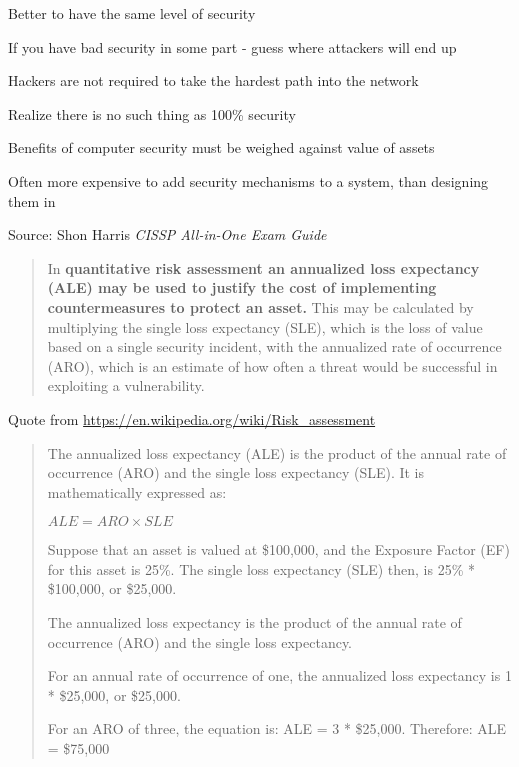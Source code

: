 \documentclass[Screen16to9,17pt]{foils}
\begin{document}
\begin{list1}
\item Better to have the same level of security
\item If you have bad security in some part - guess where attackers will end up
\item Hackers are not required to take the hardest path into the network
\item Realize there is no such thing as 100\% security
\end{list1}



\begin{list1}
\item Benefits of computer security must be weighed against value of assets
\item Often more expensive to add security mechanisms to a system, than designing them in
\end{list1}




Source: Shon Harris \emph{CISSP All-in-One Exam Guide}



\begin{quote}
In {\bf quantitative risk assessment an annualized loss expectancy (ALE) may be used to justify the cost of implementing countermeasures to protect an asset.} This may be calculated by multiplying the single loss expectancy (SLE), which is the loss of value based on a single security incident, with the annualized rate of occurrence (ARO), which is an estimate of how often a threat would be successful in exploiting a vulnerability.
\end{quote}

Quote from \url{https://en.wikipedia.org/wiki/Risk_assessment}


\begin{quote}
The annualized loss expectancy (ALE) is the product of the annual rate of occurrence (ARO) and the single loss expectancy (SLE). It is mathematically expressed as:

${\displaystyle {ALE}={ARO}\times {SLE}}$

Suppose that an asset is valued at \$100,000, and the Exposure Factor (EF) for this asset is 25\%. The single loss expectancy (SLE) then, is 25\% * \$100,000, or \$25,000.

The annualized loss expectancy is the product of the annual rate of occurrence (ARO) and the single loss expectancy.

For an annual rate of occurrence of one, the annualized loss expectancy is 1 * \$25,000, or \$25,000.

For an ARO of three, the equation is: ALE = 3 * \$25,000. Therefore: ALE = \$75,000
\end{quote}
\end{document}
